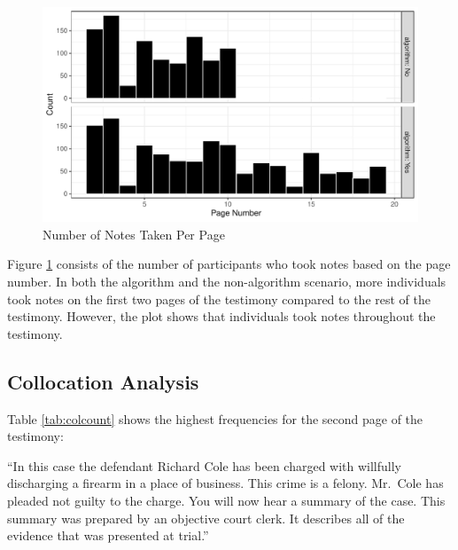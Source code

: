 \documentclass[print]{nuthesis}
\begin{document}
\begin{figure}

{\centering \includegraphics[width=\linewidth]{thesis_files/figure-latex/notecount-1} 

}

\caption{Number of Notes Taken Per Page}\label{fig:notecount}
\end{figure}

Figure \ref{fig:notecount} consists of the number of participants who took notes based on the page number.
In both the algorithm and the non-algorithm scenario, more individuals took notes on the first two pages of the testimony compared to the rest of the testimony.
However, the plot shows that individuals took notes throughout the testimony.

\hypertarget{collocation-analysis}{%
\subsection{Collocation Analysis}\label{collocation-analysis}}

Table \ref{tab:colcount} shows the highest frequencies for the second page of the testimony:

``In this case the defendant Richard Cole has been charged with willfully discharging a firearm in a place of business. This crime is a felony.
Mr.~Cole has pleaded not guilty to the charge.
You will now hear a summary of the case.
This summary was prepared by an objective court clerk.
It describes all of the evidence that was presented at trial.''
\end{document}
